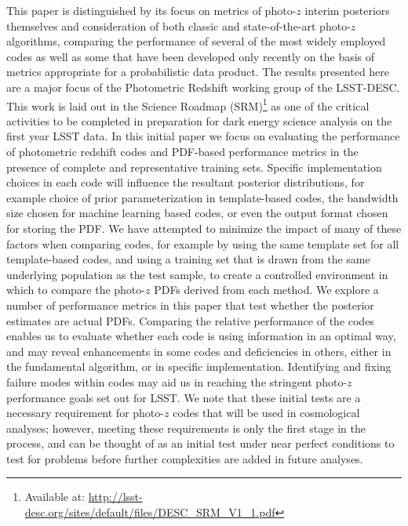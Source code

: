 This paper is distinguished by its focus on metrics of photo-$z$ interim posteriors themselves and consideration of both classic and state-of-the-art photo-$z$ algorithms, comparing the performance of several of the most widely employed codes as well as some that have been developed only recently on the basis of metrics appropriate for a probabilistic data product.
The results presented here are
a major focus of the Photometric Redshift working group of the LSST-DESC.
This work is laid out in the Science Roadmap (SRM)\footnote{Available at: \url{http://lsst-desc.org/sites/default/files/DESC_SRM_V1_1.pdf}} as one of the critical activities to be completed in preparation for dark energy science analysis on the first year LSST data.
In this initial paper we focus on evaluating the performance of photometric redshift codes and PDF-based performance metrics in the presence of complete and representative training sets.  Specific implementation choices in each code will influence the resultant posterior distributions, for example choice of prior parameterization in template-based codes, the bandwidth size chosen for machine learning based codes, or even the output format chosen for storing the PDF.  We have attempted to minimize the impact of many of these factors when comparing codes, for example by using the same template set for all template-based codes, and using a training set that is drawn from the same underlying population as the test sample, to create a controlled environment in which to compare the photo-$z$ PDFs derived from each method.  We explore a number of performance metrics in this paper that test whether the posterior estimates are actual PDFs.  
Comparing the relative performance of the codes enables us to evaluate whether each code is using information in an optimal way, and may reveal enhancements in some codes and deficiencies in others, either in the fundamental algorithm, or in specific implementation.  Identifying and fixing failure modes within codes may aid us in reaching the stringent photo-$z$ performance goals set out for LSST.  We note that these initial tests are a necessary requirement for photo-$z$ codes that will be used in cosmological analyses; however, meeting these requirements is only the first stage in the process, and can be thought of as an initial test under near perfect conditions to test for problems before further complexities are added in future analyses.



